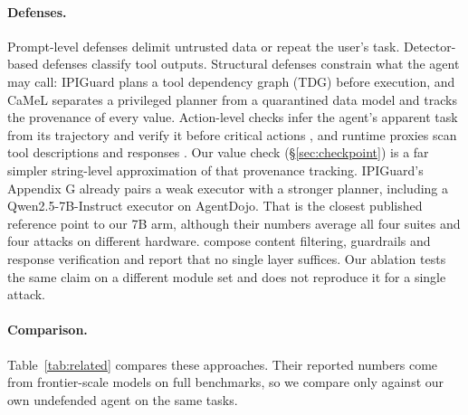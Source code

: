 \documentclass[11pt]{article}
\begin{document}
\paragraph{Defenses.} Prompt-level defenses delimit untrusted data \citep{hines2024spotlighting} or repeat the user's task. Detector-based defenses classify tool outputs. Structural defenses constrain what the agent may call: IPIGuard \citep{an2025ipiguard} plans a tool dependency graph (TDG) before execution, and CaMeL \citep{debenedetti2025camel} separates a privileged planner from a quarantined data model and tracks the provenance of every value. Action-level checks infer the agent's apparent task from its trajectory and verify it before critical actions \citep{fang2025inferact}, and runtime proxies scan tool descriptions and responses \citep{yergattikar2026shieldmcp}. Our value check (\S\ref{sec:checkpoint}) is a far simpler string-level approximation of that provenance tracking. IPIGuard's Appendix G already pairs a weak executor with a stronger planner, including a Qwen2.5-7B-Instruct executor on AgentDojo. That is the closest published reference point to our 7B arm, although their numbers average all four suites and four attacks on different hardware. \citet{ramakrishnan2025securing} compose content filtering, guardrails and response verification and report that no single layer suffices. Our ablation tests the same claim on a different module set and does not reproduce it for a single attack.

\paragraph{Comparison.} Table~\ref{tab:related} compares these approaches. Their reported numbers come from frontier-scale models on full benchmarks, so we compare only against our own undefended agent on the same tasks.
\end{document}
